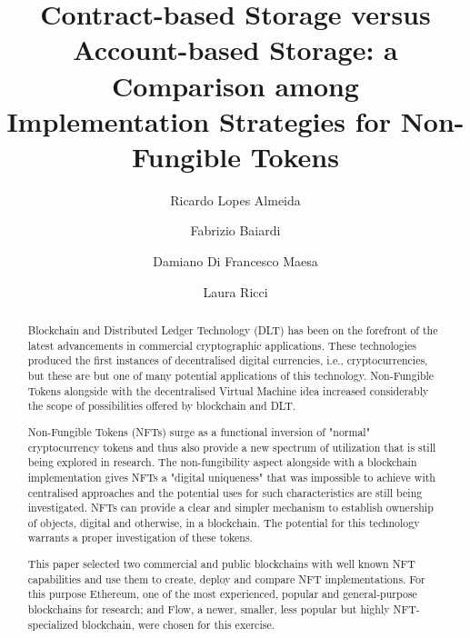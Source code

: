 \documentclass[10pt]{article}
\author[1]{Ricardo Lopes Almeida}
\author[2]{Fabrizio Baiardi}
\author[3]{Damiano Di Francesco Maesa}
\author[4]{Laura Ricci}
\affil[1, 2, 3, 4]{Dipartimento di Informatica, Università di Pisa, Italia}
\affil[1]{Università di Camerino, Italia}
\title{Contract-based Storage versus Account-based Storage: a Comparison among Implementation Strategies for Non-Fungible Tokens }
\begin{document}
\maketitle

\begin{abstract}
    Blockchain and Distributed Ledger Technology (DLT) has been on the forefront of the latest advancements in commercial cryptographic applications. These technologies produced the first instances of decentralised digital currencies, i.e., cryptocurrencies, but these are but one of many potential applications of this technology. Non-Fungible Tokens alongside with the decentralised Virtual Machine idea increased considerably the scope of possibilities offered by blockchain and DLT.
    \par
    Non-Fungible Tokens (NFTs) surge as a functional inversion of "normal" cryptocurrency tokens and thus also provide a new spectrum of utilization that is still being explored in research. The non-fungibility aspect alongside with a blockchain implementation gives NFTs a "digital uniqueness" that was impossible to achieve with centralised approaches and the potential uses for such characteristics are still being investigated. NFTs can provide a clear and simpler mechanism to establish ownership of objects, digital and otherwise, in a blockchain. The potential for this technology warrants a proper investigation of these tokens.
    \par
    This paper selected two commercial and public blockchains with well known NFT capabilities and use them to create, deploy and compare NFT implementations. For this purpose Ethereum, one of the most experienced, popular and general-purpose blockchains for research; and Flow, a newer, smaller, less popular but highly NFT-specialized blockchain, were chosen for this exercise.
    \par
\end{abstract}



















\printbibliography
\end{document}
